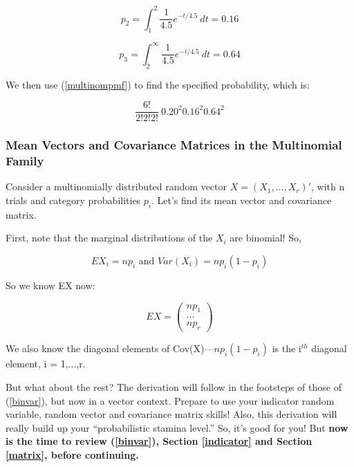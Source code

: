 \begin{equation}
p_2 = \int_{1}^{2} \frac{1}{4.5} e^{-t/4.5} ~ dt = 0.16
\end{equation}

\begin{equation}
p_3 = \int_{2}^{\infty} \frac{1}{4.5} e^{-t/4.5} ~ dt = 0.64
\end{equation}

We then use (\ref{multinompmf}) to find the specified probability, which
is:

\begin{equation}
\frac{6!}{2!2!2!} ~
0.20^2
0.16^2
0.64^2
\end{equation}

\subsubsection{Mean Vectors and Covariance Matrices in the Multinomial
Family}

Consider a multinomially distributed random vector $X = (X_1,...,X_r)'$,
with n trials and category probabilities $p_i$.  Let's find its mean
vector and covariance matrix.

First, note that the marginal distributions of the $X_i$ are binomial!
So, 

\begin{equation}
\label{multinommeanvar}
EX_i = np_i \textrm{ and } Var(X_i) = np_i(1-p_i)
\end{equation}

So we know EX now:

\begin{equation}
EX = 
\left (
\begin{array}{c}
np_1 \\
... \\
np_r
\end{array}
\right )
\end{equation}

We also know the diagonal elements of Cov(X)---$np_i(1-p_i)$ is the
i$^{th}$ diagonal element, i = 1,...,r.  

But what about the rest?  The derivation will follow in the footsteps of
those of (\ref{binvar}), but now in a vector context.  Prepare to use
your indicator random variable, random vector and covariance matrix
skills!  Also, this derivation will really build up your ``probabilistic
stamina level.''  So, it's good for you!  But {\bf now is the time to review
(\ref{binvar}), Section \ref{indicator} and Section \ref{matrix}, before
continuing.}  

